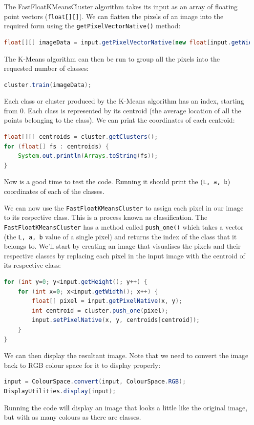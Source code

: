 \documentclass[10pt,a4paper,twoside,extrafontsizes]{memoir}
\begin{document}
The FastFloatKMeansCluster algorithm takes its input as an array of floating point vectors
(\verb+float[][]+). We can flatten the pixels of an image into the required form using the 
\verb+getPixelVectorNative()+ method:
\begin{lstlisting}[language=java]
float[][] imageData = input.getPixelVectorNative(new float[input.getWidth() * input.getHeight()][3]);
\end{lstlisting}
The K-Means algorithm can then be run to group all the pixels into the requested number of classes:
\begin{lstlisting}[language=java]
cluster.train(imageData);
\end{lstlisting}
Each class or cluster produced by the K-Means algorithm has an index, starting from 0. Each class is 
represented by its centroid (the average location of all the points belonging to the class). We can 
print the coordinates of each centroid:
\begin{lstlisting}[language=java]
float[][] centroids = cluster.getClusters();
for (float[] fs : centroids) {
    System.out.println(Arrays.toString(fs));
}
\end{lstlisting}
Now is a good time to test the code. Running it should print the (\verb+L, a, b+) coordinates of each 
of the classes.

We can now use the \verb+FastFloatKMeansCluster+ to assign each pixel in our image to its respective 
class. This is a process known as classification. The \verb+FastFloatKMeansCluster+ has a method 
called \verb+push_one()+ which takes a vector (the \verb+L, a, b+ value of a single pixel) and 
returns the index of the class that it belongs to. We'll start by creating an image that 
visualises the pixels and their respective classes by replacing each pixel in the input image 
with the centroid of its respective class:
\begin{lstlisting}[language=java]
for (int y=0; y<input.getHeight(); y++) {
    for (int x=0; x<input.getWidth(); x++) {
        float[] pixel = input.getPixelNative(x, y);
        int centroid = cluster.push_one(pixel);
        input.setPixelNative(x, y, centroids[centroid]);
    }
}
\end{lstlisting}
We can then display the resultant image. Note that we need to convert the image back to RGB 
colour space for it to display properly:
\begin{lstlisting}[language=java]
input = ColourSpace.convert(input, ColourSpace.RGB);
DisplayUtilities.display(input);
\end{lstlisting}
Running the code will display an image that looks a little like the original image, but with 
as many colours as there are classes.
\end{document}

